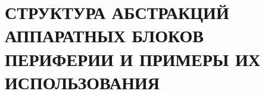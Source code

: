 \chapter{СТРУКТУРА АБСТРАКЦИЙ АППАРАТНЫХ БЛОКОВ ПЕРИФЕРИИ И ПРИМЕРЫ ИХ ИСПОЛЬЗОВАНИЯ}\label{module:op}
